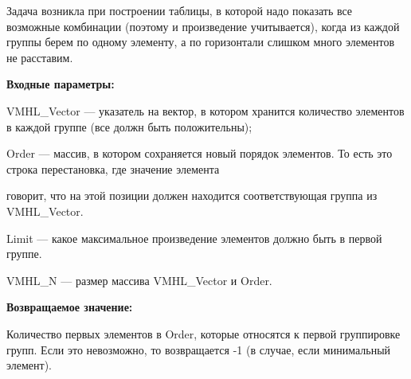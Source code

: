 Задача возникла при построении таблицы, в которой надо показать все возможные комбинации (поэтому и произведение
учитывается), когда из каждой группы берем по одному элементу, а по горизонтали слишком много элементов не расставим.

\textbf{Входные параметры:}  
 
VMHL\_Vector --- указатель на вектор, в котором хранится количество элементов в каждой группе (все должн быть положительны);
 
Order --- массив, в котором сохраняется новый порядок элементов. То есть это строка перестановка, где значение элемента
 
говорит, что на этой позиции должен находится соответствующая группа из VMHL\_Vector.
 
Limit --- какое максимальное произведение элементов должно быть в первой группе.
 
VMHL\_N --- размер массива VMHL\_Vector и Order.
 
\textbf{Возвращаемое значение:}

Количество первых элементов в Order, которые относятся к первой группировке групп. Если это невозможно, то возвращается -1 (в случае, если минимальный элемент).
